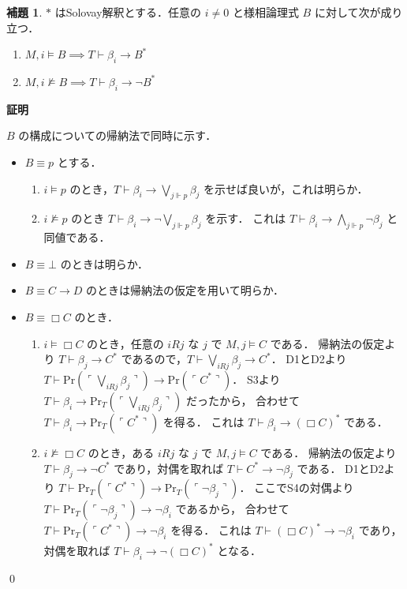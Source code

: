 \documentclass{jsarticle}
\makeatletter
\newcommand*{\Provable}{\mathrm{Pr}}
\theoremstyle{definition}
\newtheorem{lemma}[theorem]{補題}
\renewcommand{\proofname}{証明}
\renewenvironment{proof}[1][\proofname]{\par
    \normalfont 
    \topsep6\p@\@plus6\p@\relax
    \trivlist
    \item\relax
    {\bfseries\gtfamily
    #1\@addpunct{.}}\hspace\labelsep\ignorespaces
    }{%
    \endtrivlist
    \@endpefalse
}
\makeatother
\begin{document}
\begin{lemma}\label{lem:solovay_interpretation}
	$*$ はSolovay解釈とする．任意の $i \neq 0$ と様相論理式 $B$ に対して次が成り立つ．
	\begin{enumerate}
		\item $M, i \vDash B \implies T \vdash \beta_i \to B^*$
		\item $M, i \nvDash B \implies T \vdash \beta_i \to \lnot B^*$
	\end{enumerate}
\end{lemma}
\begin{proof}
	$B$ の構成についての帰納法で同時に示す．
	\begin{itemize}
		\item
		      $B \equiv p$ とする．
		      \begin{enumerate}
			      \item
			            $i \vDash p$ のとき，$T \vdash \beta_i \to \bigvee_{j \Vdash p} \beta_j $ を示せば良いが，これは明らか．
			      \item
			            $i \nvDash p$ のとき $T \vdash \beta_i \to \lnot \bigvee_{j \Vdash p} \beta_j$ を示す．
			            これは $T \vdash \beta_i \to \bigwedge_{j \Vdash p} \lnot \beta_j$ と同値である．
		      \end{enumerate}
		\item $B \equiv \bot$ のときは明らか．
		\item $B \equiv C \to D$ のときは帰納法の仮定を用いて明らか．
		\item
		      $B \equiv \Box C$ のとき．
		      \begin{enumerate}
			      \item
			            $i \vDash \Box C$ のとき，任意の $i R j$ な $j$ で $M, j \vDash C$ である．
			            帰納法の仮定より $T \vdash \beta_j \to C^*$ であるので，$T \vdash \bigvee_{i R j} \beta_j \to C^*$．
			            D1とD2より $T \vdash \Provable(\ulcorner \bigvee_{i R j} \beta_j \urcorner) \to \Provable(\ulcorner C^* \urcorner)$．
			            S3より $T \vdash \beta_i \to \Provable_T(\ulcorner \bigvee_{i R j} \beta_j \urcorner)$ だったから，
			            合わせて $T \vdash \beta_i \to \Provable_T(\ulcorner C^* \urcorner)$ を得る．
			            これは $T \vdash \beta_i \to (\Box C)^*$ である．
			      \item
			            $i \nvDash \Box C$ のとき，ある $i R j$ な $j$ で $M, j \vDash C$ である．
			            帰納法の仮定より $T \vdash \beta_j \to \lnot C^*$ であり，対偶を取れば $T \vdash C^* \to \lnot \beta_j$ である．
			            D1とD2より $T \vdash \Provable_T(\ulcorner C^* \urcorner) \to \Provable_T(\ulcorner \lnot \beta_j \urcorner)$．
			            ここでS4の対偶より $T \vdash \Provable_T(\ulcorner \lnot \beta_j \urcorner) \to \lnot \beta_i$ であるから，
			            合わせて $T \vdash \Provable_T(\ulcorner C^* \urcorner) \to \lnot \beta_i$ を得る．
			            これは $T \vdash (\Box C)^* \to \lnot \beta_i$ であり，対偶を取れば $T \vdash \beta_i \to \lnot (\Box C)^*$ となる．
		      \end{enumerate}
	\end{itemize}
	\qed
\end{proof}
\end{document}
